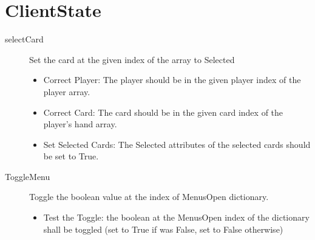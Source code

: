 \section{ClientState}
\begin{description}
	\item[selectCard] Set the card at the given index of the array to Selected
	\begin{itemize}
		\item Correct Player: The player should be in the given player index of the player array.
		\item Correct Card: The card should be in the given card index of the player's hand array.
		\item Set Selected Cards: The Selected attributes of the selected cards should be set to True.
	\end{itemize}
	\item[ToggleMenu] Toggle the boolean value at the index of MenusOpen dictionary.
	\begin{itemize}
		\item Test the Toggle: the boolean at the MenusOpen index of the dictionary shall be toggled (set to True if was False, set to False otherwise)
    \end{itemize}
\end{description}

